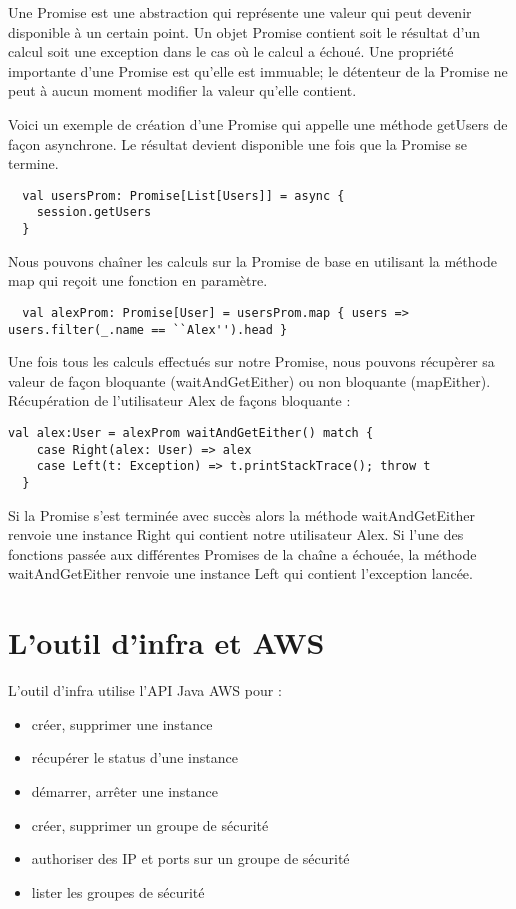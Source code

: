 Une Promise est une abstraction qui représente une valeur qui peut devenir
disponible à un certain point.
Un objet Promise contient soit le résultat d'un calcul soit une exception dans
le cas où le calcul a échoué.
Une propriété importante d'une Promise est qu'elle est immuable; le détenteur de
la Promise ne peut à aucun moment modifier la valeur qu'elle contient.

Voici un exemple de création d'une Promise qui appelle une méthode getUsers de
façon asynchrone. Le résultat devient disponible une fois que la Promise se
termine.
\lstset{language=scala,
  frame=single                   %
}
\begin{lstlisting}
  val usersProm: Promise[List[Users]] = async {
    session.getUsers
  }
\end{lstlisting}

Nous pouvons chaîner les calculs sur la Promise de base en utilisant la méthode
map qui reçoit une fonction en paramètre.
\begin{lstlisting}
  val alexProm: Promise[User] = usersProm.map { users => users.filter(_.name == ``Alex'').head }
\end{lstlisting}

Une fois tous les calculs effectués sur notre Promise, nous pouvons récupèrer sa
valeur de façon bloquante (waitAndGetEither) ou non bloquante (mapEither).
Récupération de l'utilisateur Alex de façons bloquante :
\begin{lstlisting}
val alex:User = alexProm waitAndGetEither() match {
    case Right(alex: User) => alex
    case Left(t: Exception) => t.printStackTrace(); throw t
  }
\end{lstlisting}
Si la Promise s'est terminée avec succès alors la méthode waitAndGetEither
renvoie une instance Right qui contient notre utilisateur Alex.
Si l'une des fonctions passée aux différentes Promises de la chaîne a échouée, la
méthode waitAndGetEither renvoie une instance Left qui contient l'exception
lancée.

\section{L'outil d'infra et AWS}

L'outil d'infra utilise l'API Java AWS pour :
\begin{itemize}
\item créer, supprimer une instance
\item récupérer le status d'une instance
\item démarrer, arrêter une instance
\item créer, supprimer un groupe de sécurité
\item authoriser des IP et ports sur un groupe de sécurité
\item lister les groupes de sécurité
\end{itemize}

